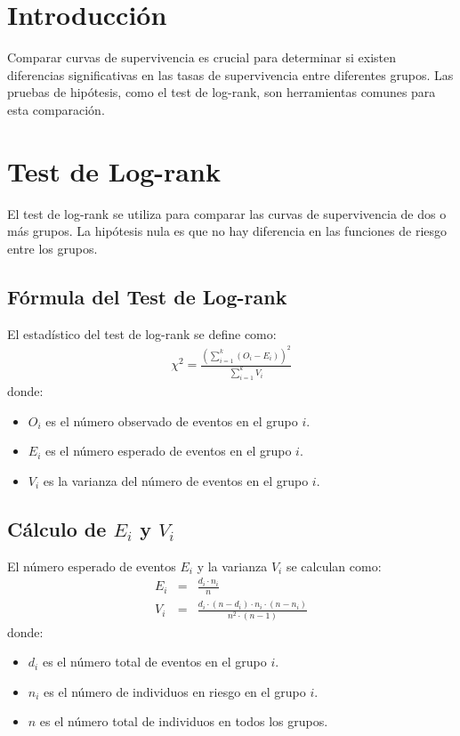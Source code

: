 \documentclass[a4paper]{report} %
\begin{document}
\section{Introducci\'on}
Comparar curvas de supervivencia es crucial para determinar si existen diferencias significativas en las tasas de supervivencia entre diferentes grupos. Las pruebas de hip\'otesis, como el test de log-rank, son herramientas comunes para esta comparaci\'on.

\section{Test de Log-rank}
El test de log-rank se utiliza para comparar las curvas de supervivencia de dos o m\'as grupos. La hip\'otesis nula es que no hay diferencia en las funciones de riesgo entre los grupos.

\subsection{F\'ormula del Test de Log-rank}
El estad\'istico del test de log-rank se define como:
\begin{eqnarray*}
\chi^2 = \frac{\left(\sum_{i=1}^k (O_i - E_i)\right)^2}{\sum_{i=1}^k V_i}
\end{eqnarray*}
donde:
\begin{itemize}
    \item $O_i$ es el n\'umero observado de eventos en el grupo $i$.
    \item $E_i$ es el n\'umero esperado de eventos en el grupo $i$.
    \item $V_i$ es la varianza del n\'umero de eventos en el grupo $i$.
\end{itemize}

\subsection{C\'alculo de $E_i$ y $V_i$}
El n\'umero esperado de eventos $E_i$ y la varianza $V_i$ se calculan como:
\begin{eqnarray*}
E_i &=& \frac{d_i \cdot n_i}{n} \\
V_i &=& \frac{d_i \cdot (n - d_i) \cdot n_i \cdot (n - n_i)}{n^2 \cdot (n - 1)}
\end{eqnarray*}
donde:
\begin{itemize}
    \item $d_i$ es el n\'umero total de eventos en el grupo $i$.
    \item $n_i$ es el n\'umero de individuos en riesgo en el grupo $i$.
    \item $n$ es el n\'umero total de individuos en todos los grupos.
\end{itemize}
\end{document}
